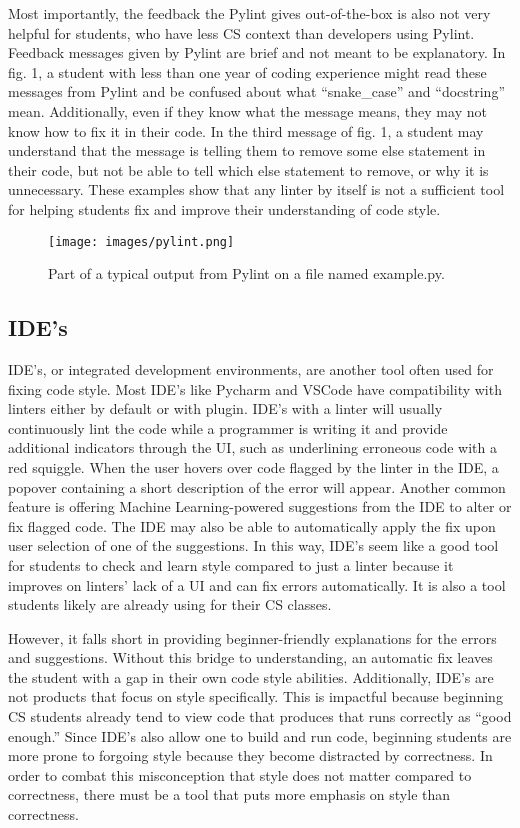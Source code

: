 \documentclass[10pt,twocolumn]{article}
\begin{document}
Most importantly, the feedback the Pylint gives out-of-the-box is also not very helpful for students, who have less CS context than developers using Pylint. 
Feedback messages given by Pylint are brief and not meant to be explanatory.
In fig. 1, a student with less than one year of coding experience might read these messages from Pylint and be confused about what “snake\_case” and “docstring” mean. 
Additionally, even if they know what the message means, they may not know how to fix it in their code.
In the third message of fig. 1, a student may understand that the message is telling them to remove some else statement in their code, but not be able to tell which else statement to remove, or why it is unnecessary.
These examples show that any linter by itself is not a sufficient tool for helping students fix and improve their understanding of code style.

\begin{figure}
\texttt{[image: images/pylint.png]}
\centering
 \vspace{.5cm}
\caption{Part of a typical output from Pylint on a file named example.py.}
\end{figure}

\subsection{IDE's}
IDE's, or integrated development environments, are another tool often used for fixing code style. 
Most IDE's like Pycharm and VSCode have compatibility with linters either by default or with plugin. 
IDE's with a linter will usually continuously lint the code while a programmer is writing it and provide additional indicators through the UI, such as underlining erroneous code with a red squiggle. 
When the user hovers over code flagged by the linter in the IDE, a popover containing a short description of the error will appear. 
Another common feature is offering Machine Learning-powered suggestions from the IDE to alter or fix flagged code. 
The IDE may also be able to automatically apply the fix upon user selection of one of the suggestions. 
In this way, IDE's seem like a good tool for students to check and learn style compared to just a linter because it improves on linters' lack of a UI and can fix errors automatically. 
It is also a tool students likely are already using for their CS classes.

However, it falls short in providing beginner-friendly explanations for the errors and suggestions. 
Without this bridge to understanding, an automatic fix leaves the student with a gap in their own code style abilities. 
Additionally, IDE's are not products that focus on style specifically. 
This is impactful because beginning CS students already tend to view code that produces that runs correctly as “good enough.” 
Since IDE's also allow one to build and run code, beginning students are more prone to forgoing style because they become distracted by correctness. 
In order to combat this misconception that style does not matter compared to correctness, there must be a tool that puts more emphasis on style than correctness. 
\end{document}
